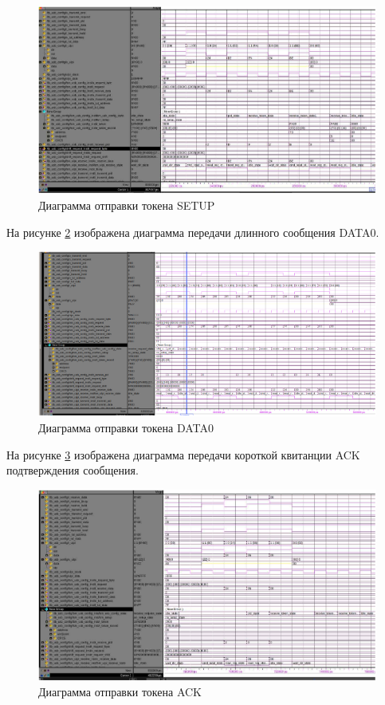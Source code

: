 \begin{figure}[ht]
    \centering
    \includegraphics[scale=0.7]{res/img/verification_setup.png}
    \caption{Диаграмма отправки токена SETUP}
    \label{fig:verification_setup}
\end{figure}

\pagebreak
На рисунке \ref{fig:verification_data0} изображена диаграмма передачи длинного сообщения DATA0.

\begin{figure}[ht]
    \centering
    \includegraphics[scale=0.7]{res/img/verification_data0.png}
    \caption{Диаграмма отправки токена DATA0}
    \label{fig:verification_data0}
\end{figure}

На рисунке \ref{fig:verification_ack} изображена диаграмма передачи короткой квитанции ACK подтверждения сообщения.


\begin{figure}[ht]
    \centering
    \includegraphics[scale=0.7]{res/img/verification_ack.png}
    \caption{Диаграмма отправки токена ACK}
    \label{fig:verification_ack}
\end{figure}


